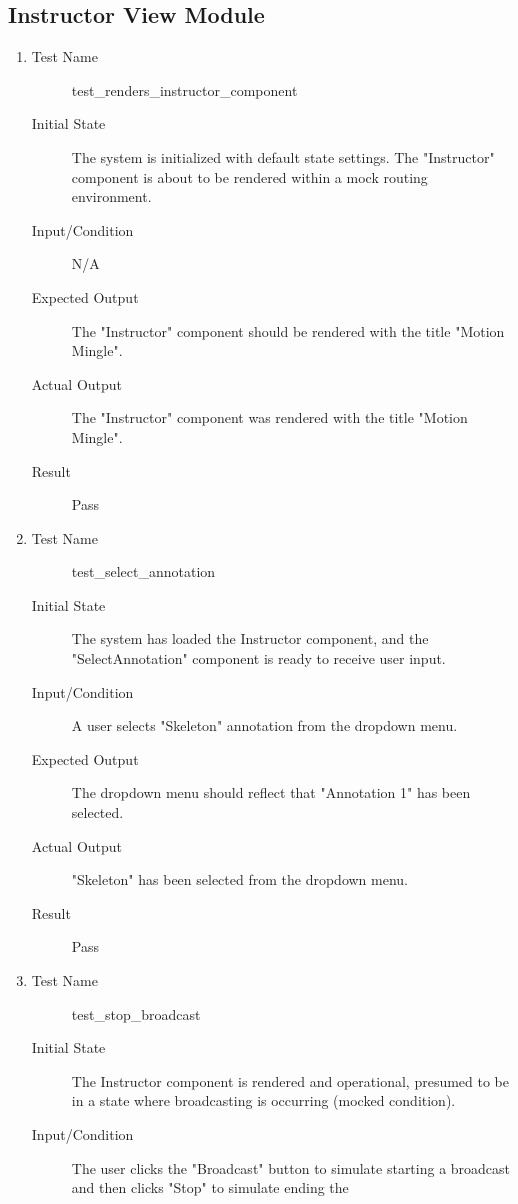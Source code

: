 \documentclass[12pt, titlepage]{article}
\begin{document}
\subsection{Instructor View Module}
\begin{enumerate}[UT-M1]
\item \label{UT-M1}
  \begin{description}
  \item[Test Name] test\_renders\_instructor\_component
  \item[Initial State] The system is initialized with default state settings.
    The "Instructor" component is about to be rendered within a mock routing
    environment.
  \item[Input/Condition] N/A
  \item[Expected Output] The "Instructor" component should be rendered with the
    title "Motion Mingle".
  \item[Actual Output] The "Instructor" component was rendered with the title
    "Motion Mingle".
  \item[Result] Pass
  \end{description}
\item \label{UT-M2}
  \begin{description}
  \item[Test Name] test\_select\_annotation
  \item[Initial State] The system has loaded the Instructor component, and the
    "SelectAnnotation" component is ready to receive user input.
  \item[Input/Condition] A user selects "Skeleton" annotation from the dropdown
    menu.
  \item[Expected Output] The dropdown menu should reflect that "Annotation 1"
    has been selected.
  \item[Actual Output] "Skeleton" has been selected from the dropdown menu.
  \item[Result] Pass
  \end{description}
\item \label{UT-M3}
  \begin{description}
  \item[Test Name] test\_stop\_broadcast
  \item[Initial State] The Instructor component is rendered and operational,
    presumed to be in a state where broadcasting is occurring (mocked
    condition).
  \item[Input/Condition] The user clicks the "Broadcast" button to simulate
    starting a broadcast and then clicks "Stop" to simulate ending the

\end{description}
\end{enumerate}
\end{document}
